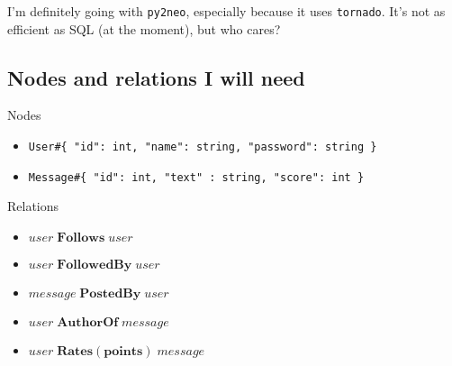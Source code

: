 \documentclass[11pt]{article}
\begin{document}
  I'm definitely going with \texttt{py2neo}, especially because it uses
  \texttt{tornado}. It's not as efficient as SQL (at the moment), but who
  cares?
\subsection{Nodes and relations I will need}
\label{sec-3-1}

   
   Nodes
\begin{itemize}
\item \texttt{User\#\{ "id": int, "name": string, "password": string \}}
\item \texttt{Message\#\{ "id": int, "text" : string, "score": int \}}
\end{itemize}
   
   Relations
\begin{itemize}
\item $user \; \boldsymbol{Follows} \; user$
\item $user \; \boldsymbol{FollowedBy} \; user$
\item $message \; \boldsymbol{PostedBy} \; user$
\item $user \; \boldsymbol{AuthorOf} \; message$
\item $user \; \boldsymbol{Rates(points)} \; message$
\end{itemize}
\end{document}
